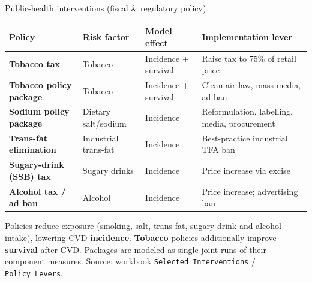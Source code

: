 \documentclass[
  ignorenonframetext,
  aspectratio=169]{beamer}
\begin{document}
\begin{frame}{Public-health interventions (fiscal \& regulatory policy)}
\label{public-health-interventions-fiscal-regulatory-policy}
\begin{table}[!h]
\centering\begingroup\fontsize{8}{10}\selectfont

\begin{tabular}[t]{>{\raggedright\arraybackslash}p{3.1cm}>{\raggedright\arraybackslash}p{2.4cm}>{\raggedright\arraybackslash}p{3.2cm}>{\raggedright\arraybackslash}p{5.0cm}}
\toprule
\textbf{Policy} & \textbf{Risk factor} & \textbf{Model effect} & \textbf{Implementation lever}\\
\midrule
\textbf{Tobacco tax} & Tobacco & \textcolor{incidencecol}{Incidence} + \textcolor{casefatalcol}{survival} & Raise tax to 75\% of retail price\\
\textbf{Tobacco policy package} & Tobacco & \textcolor{incidencecol}{Incidence} + \textcolor{casefatalcol}{survival} & Clean-air law, mass media, ad ban\\
\textbf{Sodium policy package} & Dietary salt/sodium & \textcolor{incidencecol}{Incidence} & Reformulation, labelling, media, procurement\\
\textbf{Trans-fat elimination} & Industrial trans-fat & \textcolor{incidencecol}{Incidence} & Best-practice industrial TFA ban\\
\textbf{Sugary-drink (SSB) tax} & Sugary drinks & \textcolor{incidencecol}{Incidence} & Price increase via excise\\
\addlinespace
\textbf{Alcohol tax / ad ban} & Alcohol & \textcolor{incidencecol}{Incidence} & Price increase; advertising ban\\
\bottomrule
\end{tabular}
\endgroup{}
\end{table}

\vspace{1pt}

\footnotesize Policies reduce exposure (smoking, salt, trans-fat,
sugary-drink and alcohol intake), lowering CVD \textbf{incidence}.
\textbf{Tobacco} policies additionally improve \textbf{survival} after
CVD. Packages are modeled as single joint runs of their component
measures. \scriptsize Source: workbook \texttt{Selected\_Interventions}
/ \texttt{Policy\_Levers}.
\end{frame}
\end{document}
